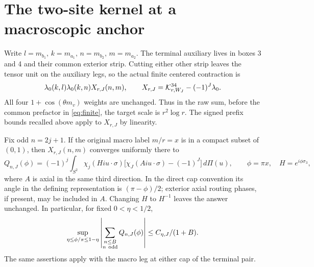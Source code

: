 \section{The two-site kernel at a macroscopic anchor}\label{sec:macro}

Write \(l=m_{b_1},\,k=m_{a_1},\,n=m_{b_2},\,m=m_{a_2}\). The terminal auxiliary lives in boxes 3 and 4 and their common exterior strip. Cutting either other strip leaves the tensor unit on the auxiliary legs, so the actual finite centered contraction is
\begin{equation}\label{eq:fact}
       \lambda_0(k,l)\lambda_0(k,n)X_{r,J}(n,m),\qquad
 X_{r,J}=\mathcal K^{34}_{r,W_J}-(-1)^J\lambda_0 .
\end{equation}
All four \(1+\cos(\theta m_v)\) weights are unchanged. Thus in the raw sum, before the common prefactor in \eqref{eq:finite}, the target scale is \(r^2\log r\). The signed prefix bounds recalled above apply to \(X_{r,J}\) by linearity.

\begin{lemma}\label{lem:macro}
Fix odd \(n=2j+1\). If the original macro label \(m/r=x\) is in a compact subset of \((0,1)\), then \(X_{r,J}(n,m)\) converges uniformly there to
\begin{equation}\label{eq:macrokernel}
 Q_{n,J}(\phi)=(-1)^j\int_{S^2}\chi_j(Hiu\cdot\sigma)
       \big[\chi_J(Aiu\cdot\sigma)-(-1)^J\big]\,d\Pi(u),
 \qquad \phi=\pi x,\quad H=e^{i\phi\sigma_3},
\end{equation}
where \(A\) is axial in the same third direction. In the direct cap convention its angle in the defining representation is \((\pi-\phi)/2\); exterior axial routing phases, if present, may be included in \(A\). Changing \(H\) to \(H^{-1}\) leaves the answer unchanged. In particular, for fixed \(0<\eta<1/2\),
\begin{equation}\label{eq:macroprefix}
 \sup_{\eta\le\phi/\pi\le1-\eta}
        \left|\sum_{\substack{n\le B\\n\ {\rm odd}}}Q_{n,J}(\phi)\right|
      \le C_{\eta,J}/(1+B).
\end{equation}
The same assertions apply with the macro leg at either cap of the terminal pair.
\end{lemma}

